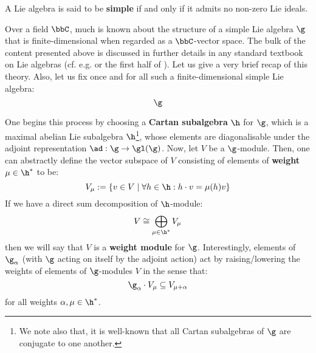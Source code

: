         \begin{definition}
            A Lie algebra is said to be \textbf{simple} if and only if it admits no non-zero Lie ideals. 
        \end{definition}

        Over a field $\bbC$, much is known about the structure of a simple Lie algebra $\g$ that is finite-dimensional when regarded as a $\bbC$-vector space. The bulk of the content presented above is discussed in further details in any standard textbook on Lie algebras (cf. e.g. \cite{humphreys_lie_algebras} or the first half of \cite{carter_affine_lie_algebras}). Let us give a very brief recap of this theory. Also, let us fix once and for all such a finite-dimensional simple Lie algebra:
            $$\g$$

        One begins this process by choosing a \textbf{Cartan subalgebra} $\h$ for $\g$, which is a maximal abelian Lie subalgebra $\h$\footnote{We note also that, it is well-known that all Cartan subalgebras of $\g$ are conjugate to one another.}, whose elements are diagonalisable under the adjoint representation $\ad: \g \to \gl(\g)$. Now, let $V$ be a $\g$-module. Then, one can abstractly define the vector subspace of $V$ consisting of elements of \textbf{weight} $\mu \in \h^*$ to be:
            $$V_{\mu} := \{v \in V \mid \forall h \in \h: h \cdot v = \mu(h) v\}$$
        If we have a direct sum decomposition of $\h$-module:
            $$V \cong \bigoplus_{\mu \in \h^*} V_{\mu}$$
        then we will say that $V$ is a \textbf{weight module} for $\g$. Interestingly, elements of $\g_{\alpha}$ (with $\g$ acting on itself by the adjoint action) act by raising/lowering the weights of elements of $\g$-modules $V$ in the sense that:
            $$\g_{\alpha} \cdot V_{\mu} \subseteq V_{\mu + \alpha}$$
        for all weights $\alpha, \mu \in \h^*$. 
        
